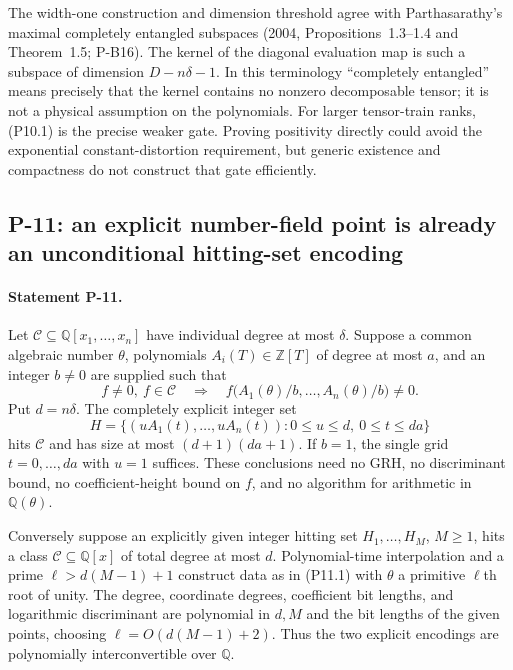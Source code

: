 The width-one construction and dimension threshold agree with Parthasarathy's maximal completely entangled subspaces (2004, Propositions~1.3--1.4 and Theorem~1.5; P-B16). The kernel of the diagonal evaluation map is such a subspace of dimension $D-n\delta-1$. In this terminology ``completely entangled'' means precisely that the kernel contains no nonzero decomposable tensor; it is not a physical assumption on the polynomials. For larger tensor-train ranks, (P10.1) is the precise weaker gate. Proving positivity directly could avoid the exponential constant-distortion requirement, but generic existence and compactness do not construct that gate efficiently.

\subsection{P-11: an explicit number-field point is already an unconditional hitting-set encoding}
\paragraph{Statement P-11.}
Let $\mathcal C\subseteq\mathbb Q[x_1,\ldots,x_n]$ have individual degree at most $\delta$. Suppose a common algebraic number $\theta$, polynomials $A_i(T)\in\mathbb Z[T]$ of degree at most $a$, and an integer $b\ne0$ are supplied such that
\[
 f\ne0,\ f\in\mathcal C\quad\Longrightarrow\quad
 f\bigl(A_1(\theta)/b,\ldots,A_n(\theta)/b\bigr)\ne0.
 \tag{P11.1}
\]
Put $d=n\delta$. The completely explicit integer set
\[
 H=\{(uA_1(t),\ldots,uA_n(t)):
        0\le u\le d,\ 0\le t\le da\}
 \tag{P11.2}
\]
hits $\mathcal C$ and has size at most $(d+1)(da+1)$. If $b=1$, the single grid $t=0,\ldots,da$ with $u=1$ suffices. These conclusions need no GRH, no discriminant bound, no coefficient-height bound on $f$, and no algorithm for arithmetic in $\mathbb Q(\theta)$.

Conversely suppose an explicitly given integer hitting set $H_1,\ldots,H_M$, $M\ge1$, hits a class $\mathcal C\subseteq\mathbb Q[x]$ of total degree at most $d$. Polynomial-time interpolation and a prime $\ell>d(M-1)+1$ construct data as in (P11.1) with $\theta$ a primitive $\ell$th root of unity. The degree, coordinate degrees, coefficient bit lengths, and logarithmic discriminant are polynomial in $d,M$ and the bit lengths of the given points, choosing $\ell=O(d(M-1)+2)$. Thus the two explicit encodings are polynomially interconvertible over $\mathbb Q$.
